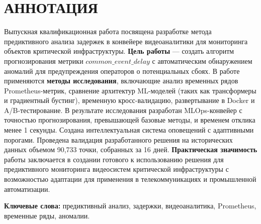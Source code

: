 \chapter*{АННОТАЦИЯ}

\hspace*{1.25cm}Выпускная квалификационная работа посвящена разработке метода предиктивного анализа задержек в конвейере видеоаналитики для мониторинга объектов критической инфраструктуры. \textbf{Цель работы} --- создать алгоритм прогнозирования метрики $common\_event\_delay$ с автоматическим обнаружением аномалий для предупреждения операторов о потенциальных сбоях. В работе применяются \textbf{методы исследования}, включающие анализ временных рядов Prometheus-метрик, сравнение архитектур ML-моделей (таких как трансформеры и градиентный бустинг), временную кросс-валидацию, развертывание в Docker и A/B-тестирование. В результате исследования разработан MLOps-конвейер с точностью прогнозирования, превышающей базовые методы, и временем отклика менее 1 секунды. Создана интеллектуальная система оповещений с адаптивными порогами. Проведена валидация разработанного решения на исторических данных объемом 90,733 точки, собранных за 16 дней. \textbf{Практическая значимость} работы заключается в создании готового к использованию решения для предиктивного мониторинга видеосистем критической инфраструктуры с возможностью адаптации для применения в телекоммуникациях и промышленной автоматизации.

\vspace*{1cm}
\hspace*{1.25cm}\textbf{Ключевые слова:} предиктивный анализ, задержки, видеоаналитика, Prometheus, временные ряды, аномалии.

\newpage 